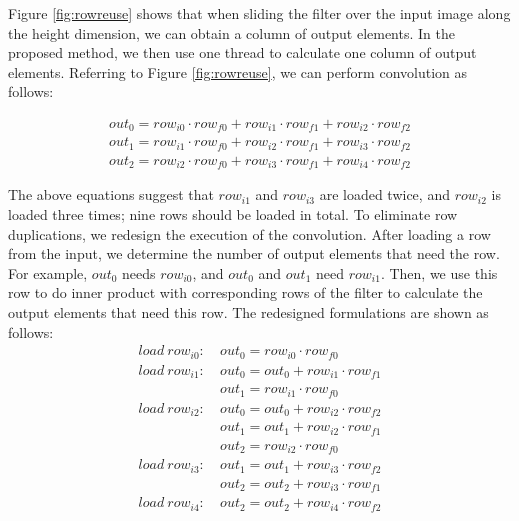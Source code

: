 Figure \ref{fig:rowreuse} shows that when sliding the filter over the input image along the height dimension, we can obtain a column of output elements. In the proposed method, we then use one thread to calculate one column of output elements. Referring to Figure \ref{fig:rowreuse},
we can perform convolution as follows:

\begin{gather*}
  out_0=row_{i0} \cdot row_{f0} + row_{i1} \cdot row_{f1} + row_{i2} \cdot row_{f2} \\
out_{1}=row_{i1} \cdot row_{f0} + row_{i2} \cdot row_{f1} + row_{i3} \cdot row_{f2} \\
out_{2}=row_{i2} \cdot row_{f0} + row_{i3} \cdot row_{f1} + row_{i4} \cdot row_{f2}
\end{gather*}

The above equations suggest that $row_{i1}$ and $row_{i3}$ are loaded twice, and $row_{i2}$ is loaded three times; nine rows should be loaded in total. To eliminate row duplications, we redesign the execution of the convolution. After loading a row from the input, we determine the number of output elements that need the row. For example, $out_0$ needs $row_{i0}$, and $out_0$ and $out_1$ need $row_{i1}$. Then, we use
this row to do inner product with corresponding rows of the filter to calculate the output elements that need this row. The redesigned formulations are shown as follows:
\begin{equation}\nonumber
\begin{aligned}
load\ row_{i0}:
&\ out_0=row_{i0} \cdot row_{f0} \\
load\ row_{i1}:
&\ out_0 = out_0+row_{i1} \cdot row_{f1}\\
&\ out_1=row_{i1} \cdot row_{f0}\\
load\ row_{i2}:
&\ out_0 = out_0+row_{i2} \cdot row_{f2}\\
&\ out_1 = out_1+row_{i2} \cdot row_{f1}\\
&\ out_{2}=row_{i2} \cdot row_{f0}\\
load\ row_{i3}:
&\ out_1=out_1+row_{i3} \cdot row_{f2} \\
&\ out_2=out_2+row_{i3} \cdot row_{f1}\\
load\ row_{i4}:
&\ out_2=out_2+row_{i4} \cdot row_{f2}
\end{aligned}	
\end{equation}



